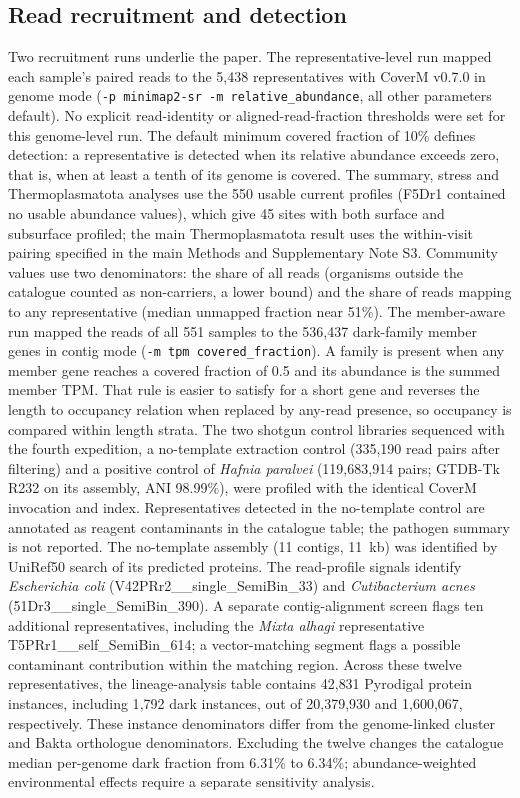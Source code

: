 \subsection*{Read recruitment and detection}
Two recruitment runs underlie the paper. The representative-level run mapped each sample's paired
reads to the 5{,}438 representatives with CoverM v0.7.0 \citep{aroney2025coverm} in genome mode
(\texttt{-p minimap2-sr -m relative\_abundance}, all other parameters default). No explicit read-identity or aligned-read-fraction thresholds were set for this genome-level run. The default minimum
covered fraction of 10\% defines detection: a representative is detected when its relative abundance
exceeds zero, that is, when at least a tenth of its genome is covered. The summary, stress and Thermoplasmatota analyses use the 550 usable current profiles (F5Dr1 contained no usable abundance values), which give 45 sites with both surface and subsurface profiled; the main Thermoplasmatota result uses the within-visit pairing specified in the main Methods and Supplementary Note S3. Community values use two denominators: the share of all reads (organisms outside
the catalogue counted as non-carriers, a lower bound) and the share of reads mapping to any
representative (median unmapped fraction near 51\%). The member-aware run mapped the reads of all 551
samples to the 536{,}437 dark-family member genes in contig mode (\texttt{-m tpm covered\_fraction}).
A family is present when any member gene reaches a covered fraction of 0.5 and its abundance is the
summed member TPM. That rule is easier to satisfy for a short gene and reverses the length to
occupancy relation when replaced by any-read presence, so occupancy is compared within length strata.
The two shotgun control libraries sequenced with the fourth expedition, a no-template extraction
control (335{,}190 read pairs after filtering) and a positive control of \emph{Hafnia paralvei}
(119{,}683{,}914 pairs; GTDB-Tk R232 on its assembly, ANI 98.99\%), were profiled with the identical
CoverM invocation and index. Representatives detected in the no-template control are annotated as
reagent contaminants in the catalogue table; the pathogen summary is not reported. The no-template assembly (11 contigs, 11~kb) was identified by UniRef50
search of its predicted proteins. The read-profile signals identify \emph{Escherichia coli} (V42PRr2\_\_single\_SemiBin\_33) and \emph{Cutibacterium acnes} (51Dr3\_\_single\_SemiBin\_390). A separate contig-alignment screen flags ten additional representatives, including the \emph{Mixta alhagi} representative T5PRr1\_\_self\_SemiBin\_614; a vector-matching segment flags a possible contaminant contribution within the matching region. Across these twelve representatives, the lineage-analysis table contains 42{,}831 Pyrodigal protein instances, including 1{,}792 dark instances, out of 20{,}379{,}930 and 1{,}600{,}067, respectively. These instance denominators differ from the genome-linked cluster and Bakta orthologue denominators. Excluding the twelve changes the catalogue median per-genome dark fraction from 6.31\% to 6.34\%; abundance-weighted environmental effects require a separate sensitivity analysis.

